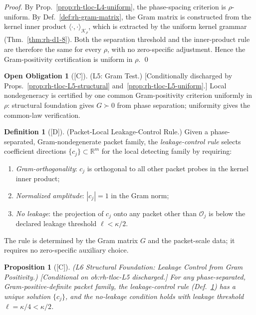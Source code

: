 \documentclass[12pt,oneside]{amsbook}
\theoremstyle{plain}
\newtheorem{proposition}[theorem]{Proposition}
\theoremstyle{definition}
\newtheorem{definition}[theorem]{Definition}
\newtheorem{obligation}[theorem]{Open Obligation}
\theoremstyle{remark}
\newcommand{\status}[1]{\textup{[#1]}}
\begin{document}
\begin{proof}
By Prop.~\ref{prop:rh-tloc-L4-uniform}, the phase-spacing criterion
is $\rho$-uniform. By Def.~\ref{def:rh-gram-matrix}, the Gram
matrix is constructed from the kernel inner product
$\langle\cdot,\cdot\rangle_{\mathcal{K}_\rho}$, which is extracted
by the uniform kernel grammar (Thm.~\ref{thm:rh-d1-8}). Both the
separation threshold and the inner-product rule are therefore the same
for every $\rho$, with no zero-specific adjustment.
Hence the Gram-positivity certification is uniform in $\rho$. \qed
\end{proof}

\begin{obligation}[\status{C}]\label{ob:rh-tloc-L5}
\textup{(L5: Gram Test.)}
\textup{[Conditionally discharged by
Props.~\ref{prop:rh-tloc-L5-structural}
and~\ref{prop:rh-tloc-L5-uniform}.]}
Local nondegeneracy is certified by one common Gram-positivity
criterion uniformly in $\rho$: structural foundation gives
$G \succ 0$ from phase separation; uniformity gives the common-law
verification.
\end{obligation}


\begin{definition}[\status{D}]\label{def:rh-leakage-control}
\textup{(Packet-Local Leakage-Control Rule.)}
Given a phase-separated, Gram-nondegenerate packet family, the
\emph{leakage-control rule} selects coefficient directions
$\{c_j\} \subset \mathbb{R}^m$ for the local detecting family by
requiring:
\begin{enumerate}[label=\textup{(\arabic*)}]
 \item \emph{Gram-orthogonality}: $c_j$ is orthogonal to all
 other packet probes in the kernel inner product;
 \item \emph{Normalized amplitude}: $|c_j| = 1$ in the Gram norm;
 \item \emph{No leakage}: the projection of $c_j$ onto any
 packet other than $\mathcal{O}_j$ is below the declared
 leakage threshold $\ell < \kappa/2$.
\end{enumerate}
The rule is determined by the Gram matrix $G$ and the packet-scale
data; it requires no zero-specific auxiliary choice.
\end{definition}

\begin{proposition}[\status{C}]\label{prop:rh-tloc-L6-structural}
\textup{(L6 Structural Foundation: Leakage Control from Gram Positivity.)}
\textup{[Conditional on ob:rh-tloc-L5 discharged.]}
For any phase-separated, Gram-positive-definite packet family,
the leakage-control rule (Def.~\ref{def:rh-leakage-control}) has a
unique solution $\{c_j\}$, and the no-leakage condition holds with
leakage threshold $\ell = \kappa/4 < \kappa/2$.
\end{proposition}
\end{document}
